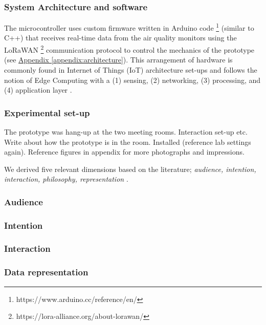 \subsubsection{System Architecture and software}

The microcontroller uses custom firmware written in Arduino code \footnote{https://www.arduino.cc/reference/en/} (similar to C++) that receives real-time data from the air quality monitors using the LoRaWAN \footnote{https://lora-alliance.org/about-lorawan/} communication protocol to control the mechanics of the prototype (see \hyperref[appendix:architecture]{Appendix \ref*{appendix:architecture}}). This arrangement of hardware is commonly found in Internet of Things (IoT) architecture set-ups and follows the notion of Edge Computing with a (1) sensing, (2) networking, (3) processing, and (4) application layer \cite{li_edge-oriented_2019, idrees_edge_2018}.

\subsubsection{Experimental set-up}

The prototype was hang-up at the two meeting rooms. Interaction set-up etc. Write about how the prototype is in the room. Installed (reference lab settings again). Reference figures in appendix for more photographs and impressions.

We derived five relevant dimensions based on the literature; \textit{audience, intention, interaction, philosophy, representation} \cite{sauve_physecology_2022, hornecker_design_2023}.

\subsubsection{Audience}

\subsubsection{Intention}

\subsubsection{Interaction}

\subsubsection{Data representation}

